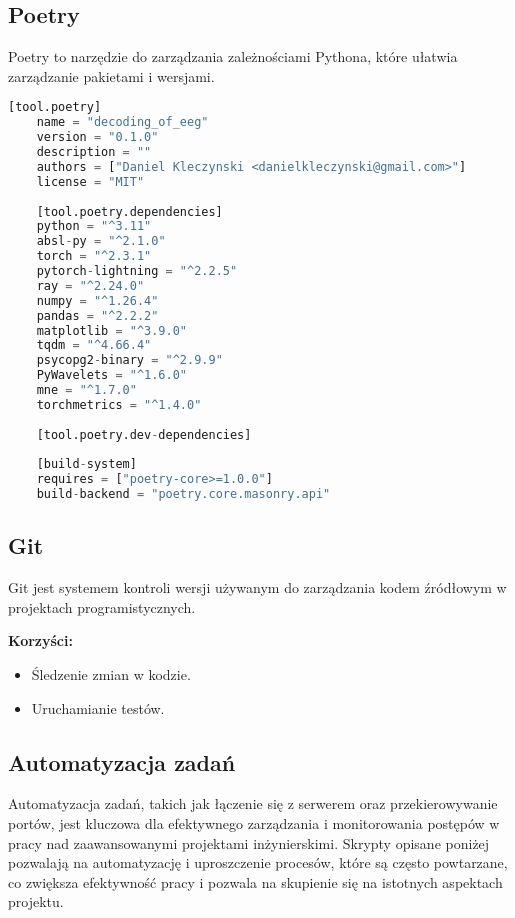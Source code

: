 \documentclass[12pt,twoside]{article}
\begin{document}
    \subsection{Poetry}
    Poetry to narzędzie do zarządzania zależnościami Pythona, które ułatwia zarządzanie pakietami i wersjami.


    \begin{lstlisting}[language=Python,caption={Poetry configuration},label={lst:poetrytoml}]
	[tool.poetry]
	name = "decoding_of_eeg"
	version = "0.1.0"
	description = ""
	authors = ["Daniel Kleczynski <danielkleczynski@gmail.com>"]
	license = "MIT"
	
	[tool.poetry.dependencies]
	python = "^3.11"
	absl-py = "^2.1.0"
	torch = "^2.3.1"
	pytorch-lightning = "^2.2.5"
	ray = "^2.24.0"
	numpy = "^1.26.4"
	pandas = "^2.2.2"
	matplotlib = "^3.9.0"
	tqdm = "^4.66.4"
	psycopg2-binary = "^2.9.9"
	PyWavelets = "^1.6.0"
	mne = "^1.7.0"
	torchmetrics = "^1.4.0"
	
	[tool.poetry.dev-dependencies]
	
	[build-system]
	requires = ["poetry-core>=1.0.0"]
	build-backend = "poetry.core.masonry.api"

    \end{lstlisting}

    \subsection{Git}
    Git jest systemem kontroli wersji używanym do zarządzania kodem źródłowym w projektach programistycznych.

    \textbf{Korzyści:}
    \begin{itemize}
        \item Śledzenie zmian w kodzie.
        \item Uruchamianie testów.
    \end{itemize}

    \subsection{Automatyzacja zadań}
    Automatyzacja zadań, takich jak łączenie się z serwerem oraz przekierowywanie portów, jest kluczowa dla efektywnego
    zarządzania i monitorowania postępów w pracy nad zaawansowanymi projektami inżynierskimi. Skrypty opisane poniżej
    pozwalają na automatyzację i uproszczenie procesów, które są często powtarzane, co zwiększa efektywność pracy i
    pozwala na skupienie się na istotnych aspektach projektu.
\end{document}
